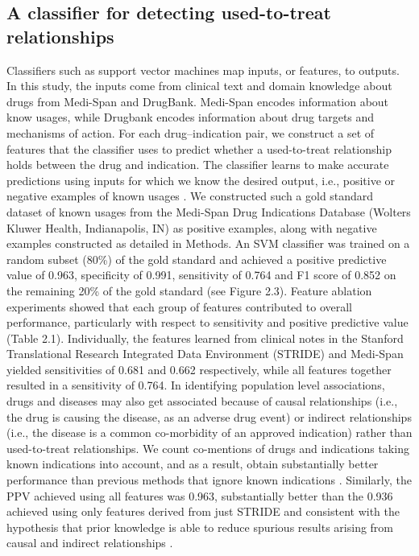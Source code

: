 \subsection{A classifier for detecting used-to-treat relationships}
Classifiers such as support vector machines map inputs, or features,
to outputs.  In this study, the inputs come from clinical text and
domain knowledge about drugs from Medi-Span and DrugBank.  Medi-Span
encodes information about know usages, while Drugbank encodes
information about drug targets and mechanisms of action.  For each
drug–indication pair, we construct a set of features that the
classifier uses to predict whether a used-to-treat relationship holds
between the drug and indication.  The classifier learns to make
accurate predictions using inputs for which we know the desired
output, i.e., positive or negative examples of known usages
\cite{Hastie2009}.  We constructed such a gold standard dataset of
known usages from the Medi-Span Drug Indications Database (Wolters
Kluwer Health, Indianapolis, IN) as positive examples, along with
negative examples constructed as detailed in Methods.  An SVM
classifier was trained on a random subset (80\%) of the gold standard
and achieved a positive predictive value of 0.963, specificity of
0.991, sensitivity of 0.764 and F1 score of 0.852 on the remaining
20\% of the gold standard (see Figure 2.3).  Feature ablation
experiments showed that each group of features contributed to overall
performance, particularly with respect to sensitivity and positive
predictive value (Table 2.1).  Individually, the features learned from
clinical notes in the Stanford Translational Research Integrated Data
Environment (STRIDE) and Medi-Span yielded sensitivities of 0.681 and
0.662 respectively, while all features together resulted in a
sensitivity of 0.764.  In identifying population level associations,
drugs and diseases may also get associated because of causal
relationships (i.e., the drug is causing the disease, as an adverse
drug event) or indirect relationships (i.e., the disease is a common
co-morbidity of an approved indication) rather than used-to-treat
relationships.  We count co-mentions of drugs and indications taking
known indications into account, and as a result, obtain substantially
better performance than previous methods that ignore known indications
\cite{Jung2013}.  Similarly, the PPV achieved using all features was
0.963, substantially better than the 0.936 achieved using only
features derived from just STRIDE and consistent with the hypothesis
that prior knowledge is able to reduce spurious results arising from
causal and indirect relationships \cite{Li2011}.

